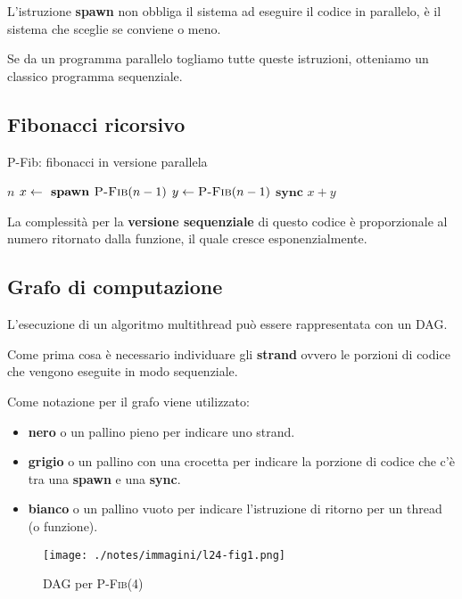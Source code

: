 L'istruzione \textbf{spawn} non obbliga il sistema ad eseguire il codice in parallelo, è il sistema che sceglie se conviene o meno.

Se da un programma parallelo togliamo tutte queste istruzioni, otteniamo un classico programma sequenziale.

\subsection{Fibonacci ricorsivo}\label{fibonacci-ricorsivo}

\begin{breakablealgorithm}
\caption{P-Fib: fibonacci in versione parallela}
\begin{algorithmic}[1]
    \State \Return $n$
\EndIf
\State $x \gets \textbf{ spawn } \textsc{P-Fib}(n-1)$ 
\State $y \gets \textsc{P-Fib}(n-1)$
\State $\textbf{sync}$
\State \Return $ x + y$
\EndFunction
\end{algorithmic}
\end{breakablealgorithm}

La complessità per la \textbf{versione sequenziale} di questo codice è proporzionale al numero ritornato dalla funzione, il quale cresce esponenzialmente.

\subsection{Grafo di computazione}\label{grafo-di-computazione}

L'esecuzione di un algoritmo multithread può essere rappresentata con un DAG.

Come prima cosa è necessario individuare gli \textbf{strand} ovvero le porzioni di codice che vengono eseguite in modo sequenziale.

Come notazione per il grafo viene utilizzato:

\begin{itemize}
\item
  \textbf{nero} o un pallino pieno per indicare uno strand.
\item
  \textbf{grigio} o un pallino con una crocetta per indicare la porzione di codice che c'è tra una \textbf{spawn} e una \textbf{sync}.
\item
  \textbf{bianco} o un pallino vuoto per indicare l'istruzione di
  ritorno per un thread (o funzione).
\end{itemize}

\begin{figure}[htbp]
\centering
\texttt{[image: ./notes/immagini/l24-fig1.png]}
\caption{DAG per \textsc{P-Fib}(4)}
\end{figure}

